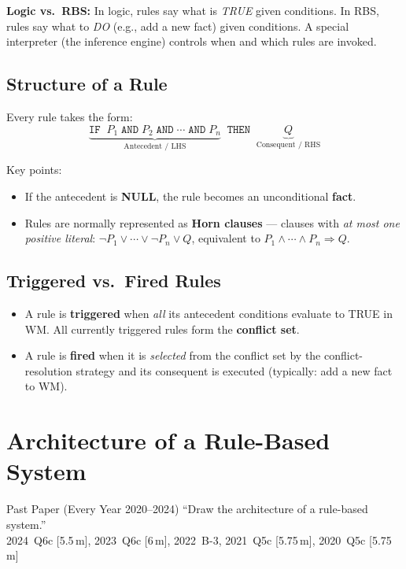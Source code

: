 \documentclass[12pt,a4paper]{article}
\begin{document}
\textbf{Logic vs.\ RBS:} In logic, rules say what is \textit{TRUE} given conditions.
In RBS, rules say what to \textit{DO} (e.g., add a new fact) given conditions.
A special interpreter (the inference engine) controls when and which rules are invoked.

\subsection{Structure of a Rule}

Every rule takes the form:
\[
\underbrace{\texttt{IF}\;\;P_1\;\texttt{AND}\;P_2\;\texttt{AND}\;\cdots\;\texttt{AND}\;P_n}_{\text{Antecedent / LHS}}
\;\;\texttt{THEN}\;\;
\underbrace{Q}_{\text{Consequent / RHS}}
\]

Key points:
\begin{itemize}
  \item If the antecedent is \textbf{NULL}, the rule becomes an unconditional \textbf{fact}.
  \item Rules are normally represented as \textbf{Horn clauses} --- clauses with
        \emph{at most one positive literal}: \(\neg P_1\vee\cdots\vee\neg P_n\vee Q\),
        equivalent to \(P_1\wedge\cdots\wedge P_n\Rightarrow Q\).
\end{itemize}

\subsection{Triggered vs.\ Fired Rules}

\begin{itemize}
  \item A rule is \textbf{triggered} when \emph{all} its antecedent conditions evaluate to TRUE in WM.
        All currently triggered rules form the \textbf{conflict set}.
  \item A rule is \textbf{fired} when it is \emph{selected} from the conflict set by the conflict-resolution
        strategy and its consequent is executed (typically: add a new fact to WM).
\end{itemize}

\section{Architecture of a Rule-Based System}

\begin{exambox}{Past Paper (Every Year 2020--2024)}
``Draw the architecture of a rule-based system.''\\
2024~Q6c [5.5\,m], 2023~Q6c [6\,m], 2022~B-3, 2021~Q5c [5.75\,m], 2020~Q5c [5.75\,m]
\end{exambox}
\end{document}
